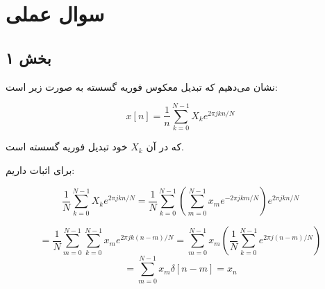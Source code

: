 \documentclass[12pt]{article}
\begin{document}
 \newpage
\section{سوال عملی}

\subsection{بخش ۱}

نشان می‌دهیم که تبدیل معکوس فوریه گسسته به صورت زیر است:

$$x[n] = \frac{1}{n} \sum_{k=0}^{N-1} X_k e^{2\pi j k n / N}$$

که در آن $X_k$ خود تبدیل فوریه گسسته است.

برای اثبات داریم:

$$\frac{1}{N} \sum_{k=0}^{N-1} X_k e^{2\pi j k n /N} = \frac{1}{N} \sum_{k=0}^{N-1}(\sum_{m=0}^{N-1} x_m e^{- 2\pi j k m/N})e^{2 \pi j k n /N}$$

$$= \frac{1}{N}\sum_{m=0}^{N-1}\sum_{k=0}^{N-1} x_m e^{2\pi j k(n-m)/N} = \sum_{m=0}^{N-1} x_m (\frac{1}{N} \sum_{k=0}^{N-1} e^{2 \pi j (n-m)/N})$$
$$=\sum_{m=0}^{N-1} x_m \delta[n-m] = x_n$$

 
\end{document}
